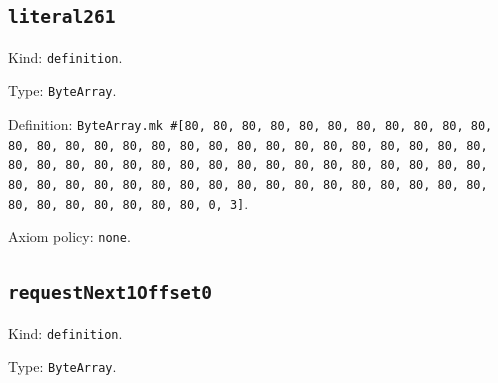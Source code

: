 \documentclass[11pt]{article}
\begin{document}
\subsection*{\texttt{literal261}}
\noindent Kind: \texttt{definition}.\par
\noindent Type: \texttt{ByteArray}.\par
\noindent Definition: \texttt{ByteArray.mk \#[80, 80, 80, 80, 80, 80, 80, 80, 80, 80, 80, 80, 80, 80, 80, 80, 80, 80, 80, 80, 80, 80, 80, 80, 80, 80, 80, 80, 80, 80, 80, 80, 80, 80, 80, 80, 80, 80, 80, 80, 80, 80, 80, 80, 80, 80, 80, 80, 80, 80, 80, 80, 80, 80, 80, 80, 80, 80, 80, 80, 80, 80, 80, 80, 80, 80, 80, 80, 80, 0, 3]}.\par
\noindent Axiom policy: \texttt{none}.\par
\subsection*{\texttt{requestNext1Offset0}}
\noindent Kind: \texttt{definition}.\par
\noindent Type: \texttt{ByteArray}.\par
\end{document}
